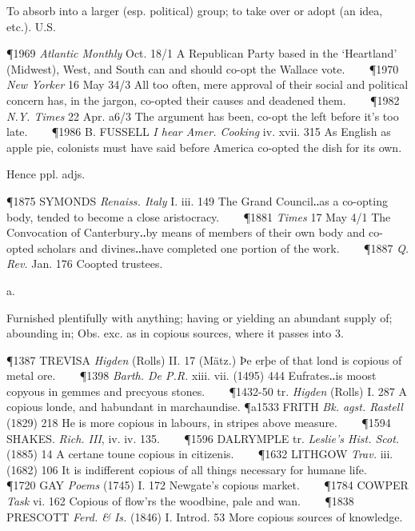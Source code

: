 \begin{description}[wide, labelwidth=!, labelindent=0pt]
\begin{myenumerate}
 To absorb into a larger (esp. political) group; to take over or adopt (an idea, etc.). U.S.

\P 1969  \textit{Atlantic Monthly} Oct. 18/1 A Republican Party based in the ‘Heartland’ (Midwest), West, and South can and should co-opt the Wallace vote.    
\P 1970  \textit{New Yorker} 16 May 34/3 All too often, mere approval of their social and political concern has, in the jargon, co-opted their causes and deadened them.    
\P 1982  \textit{N.Y. Times} 22 Apr. a6/3 The argument has been, co-opt the left before it's too late.    
\P 1986 B. FUSSELL  \textit{I hear Amer. Cooking} iv. xvii. 315 As English as apple pie, colonists must have said before America co-opted the dish for its own.

\vspace{0.1cm} \noindent
Hence  ppl. adjs.

\P 1875 SYMONDS  \textit{Renaiss. Italy} I. iii. 149 The Grand Council‥as a co-opting body, tended to become a close aristocracy.    
\P 1881  \textit{Times} 17 May 4/1 The Convocation of Canterbury‥by means of members of their own body and co-opted scholars and divines‥have completed one portion of the work.    
\P 1887  \textit{Q. Rev.} Jan. 176 Coopted trustees.
\end{myenumerate}


 a.

\noindent {}

\vspace{-0.3cm}

\begin{myenumerate}

 Furnished plentifully with anything; having or yielding an abundant supply of; abounding in; Obs. exc. as in copious sources, where it passes into 3.

\P 1387 TREVISA  \textit{Higden} (Rolls) II. 17 (Mätz.) Þe erþe of that lond is copious of metal ore.    
\P 1398 \textit{Barth. De P.R.} xiii. vii. (1495) 444 Eufrates‥is moost copyous in gemmes and precyous stones.    
\P 1432-50 tr.  \textit{Higden} (Rolls) I. 287 A copious londe, and habundant in marchaundise.
\P a1533 FRITH  \textit{Bk. agst. Rastell} (1829) 218 He is more copious in labours, in stripes above measure.    
\P 1594 SHAKES.  \textit{Rich. III}, iv. iv. 135.    
\P 1596 DALRYMPLE tr.  \textit{Leslie's Hist. Scot.} (1885) 14 A certane toune copious in citizenis.    
\P 1632 LITHGOW  \textit{Trav.} iii. (1682) 106 It is indifferent copious of all things necessary for humane life.    
\P 1720 GAY  \textit{Poems} (1745) I. 172 Newgate's copious market.    
\P 1784 COWPER  \textit{Task} vi. 162 Copious of flow'rs the woodbine, pale and wan.    
\P 1838 PRESCOTT  \textit{Ferd. \& Is.} (1846) I. Introd. 53 More copious sources of knowledge.


\end{myenumerate}
\end{description}
